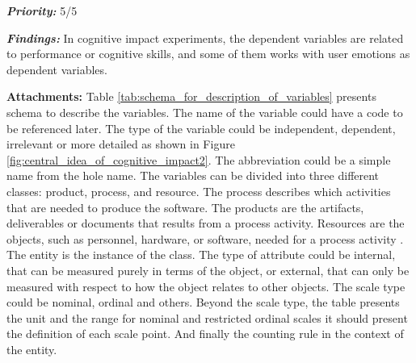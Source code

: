 \noindent \textit{\textbf{Priority:}} 5/5

\noindent \textit{\textbf{Findings:}} In cognitive impact experiments, the dependent variables are related to performance or cognitive skills, and some of them works with user emotions as dependent variables.


 
\vspace{5mm}

\noindent \textbf{Attachments:} Table \ref{tab:schema_for_description_of_variables} presents schema to describe the variables. The name of the variable could have a code to be referenced later. The type of the variable could be independent, dependent, irrelevant or more detailed as shown in Figure \ref{fig:central_idea_of_cognitive_impact2}. The abbreviation could be a simple name from the hole name. The variables can be divided into three different classes: product, process, and resource. The process describes which activities that are needed to produce the software. The products are the artifacts, deliverables or documents that results from a process activity. Resources are the objects, such as personnel, hardware, or software, needed for a process activity \cite{Wohlin2000}. The entity is the instance of the class. The type of attribute could be internal, that can be measured purely in terms of the object, or external, that can only be measured with respect to how the object relates to other objects. The scale type could be nominal, ordinal and others. Beyond the scale type, the table presents the unit and the range for nominal and restricted ordinal scales it should present the definition of each scale point. And finally the counting rule in the context of the entity.

